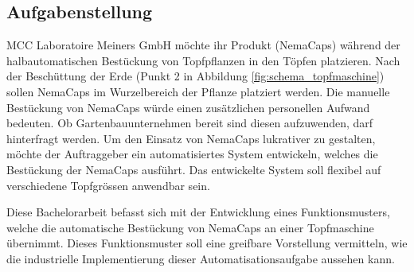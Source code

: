 \subsection{Aufgabenstellung}
MCC Laboratoire Meiners GmbH möchte ihr Produkt (NemaCaps) während der halbautomatischen Bestückung von Topfpflanzen in den Töpfen platzieren. Nach der Beschüttung der Erde (Punkt 2 in Abbildung \ref{fig:schema_topfmaschine}) sollen NemaCaps im Wurzelbereich der Pflanze platziert werden. Die manuelle Bestückung von NemaCaps würde einen zusätzlichen personellen Aufwand bedeuten. Ob Gartenbauunternehmen bereit sind diesen aufzuwenden, darf hinterfragt werden. Um den Einsatz von NemaCaps lukrativer zu gestalten, möchte der Auftraggeber ein automatisiertes System entwickeln, welches die Bestückung der NemaCaps ausführt. Das entwickelte System soll flexibel auf verschiedene Topfgrössen anwendbar sein.
\newpage

Diese Bachelorarbeit befasst sich mit der Entwicklung eines Funktionsmusters, welche die automatische Bestückung von NemaCaps an einer Topfmaschine übernimmt. Dieses Funktionsmuster soll eine greifbare Vorstellung vermitteln, wie die industrielle Implementierung dieser Automatisationsaufgabe aussehen kann. 
\newline 

